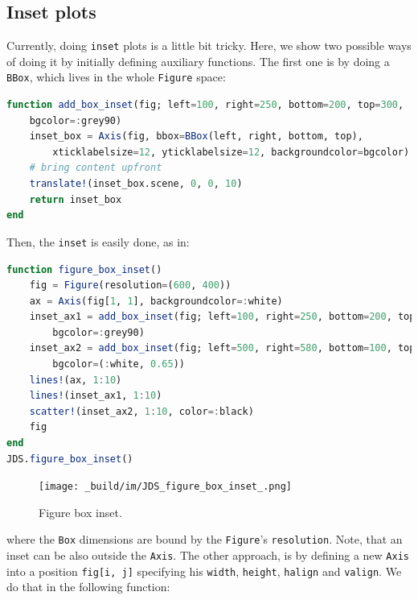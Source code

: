 \documentclass[
  notoc %
]{tufte-book}
\newcommand{\passthrough}[1]{#1}
\begin{document}
\hypertarget{inset-plots}{%
\subsection{Inset plots}\label{inset-plots}}

Currently, doing \passthrough{\lstinline!inset!} plots is a little bit
tricky. Here, we show two possible ways of doing it by initially
defining auxiliary functions. The first one is by doing a
\passthrough{\lstinline!BBox!}, which lives in the whole
\passthrough{\lstinline!Figure!} space:

\begin{lstlisting}[language=Julia]
function add_box_inset(fig; left=100, right=250, bottom=200, top=300,
    bgcolor=:grey90)
    inset_box = Axis(fig, bbox=BBox(left, right, bottom, top),
        xticklabelsize=12, yticklabelsize=12, backgroundcolor=bgcolor)
    # bring content upfront
    translate!(inset_box.scene, 0, 0, 10)
    return inset_box
end
\end{lstlisting}

Then, the \passthrough{\lstinline!inset!} is easily done, as in:

\begin{lstlisting}[language=Julia]
function figure_box_inset()
    fig = Figure(resolution=(600, 400))
    ax = Axis(fig[1, 1], backgroundcolor=:white)
    inset_ax1 = add_box_inset(fig; left=100, right=250, bottom=200, top=300,
        bgcolor=:grey90)
    inset_ax2 = add_box_inset(fig; left=500, right=580, bottom=100, top=200,
        bgcolor=(:white, 0.65))
    lines!(ax, 1:10)
    lines!(inset_ax1, 1:10)
    scatter!(inset_ax2, 1:10, color=:black)
    fig
end
JDS.figure_box_inset()
\end{lstlisting}

\begin{figure}
\hypertarget{fig:figure_box_inset}{%
\centering
\texttt{[image: \_build/im/JDS\_figure\_box\_inset\_.png]}
\caption{Figure box inset.}\label{fig:figure_box_inset}
}
\end{figure}

where the \passthrough{\lstinline!Box!} dimensions are bound by the
\passthrough{\lstinline!Figure!}'s \passthrough{\lstinline!resolution!}.
Note, that an inset can be also outside the
\passthrough{\lstinline!Axis!}. The other approach, is by defining a new
\passthrough{\lstinline!Axis!} into a position
\passthrough{\lstinline!fig[i, j]!} specifying his
\passthrough{\lstinline!width!}, \passthrough{\lstinline!height!},
\passthrough{\lstinline!halign!} and \passthrough{\lstinline!valign!}.
We do that in the following function:
\end{document}
